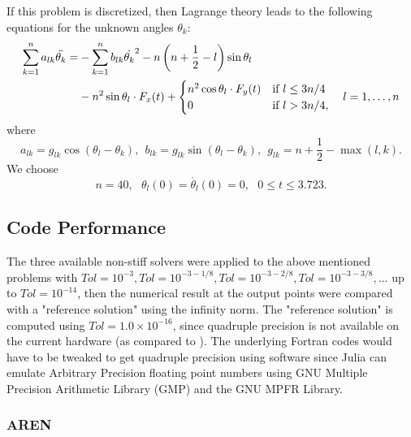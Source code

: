 \documentclass[notitlepage,12pt]{article}
\begin{document}
If this problem is discretized, then Lagrange theory leads to the following equations for the unknown angles $\theta_k$:
\begin{equation}
\begin{aligned}
\sum _{k=1}^n a_{lk} \ddot{\theta_k} = &-\sum _{k=1}^n b_{lk} \dot{\theta_k}^2 -n\left(n+\frac{1}{2} -l \right)\sin{\theta_l}\\
&-n^2\sin{\theta_l}\cdot F_x(t) + \begin{cases}
               n^2\cos{\theta_l}\cdot F_y(t) &\textnormal{if}\ l\leq 3n/4\\
               0 &\textnormal{if}\ l > 3n/4,
            \end{cases} \ \ \  l = 1,\ldots,n
\end{aligned}
\end{equation}
where
\begin{equation}
	a_{lk} = g_{lk}\cos{(\theta_l -\theta_k)}, \ \ b_{lk} = g_{lk}\sin{(\theta_l -\theta_k)},\ \ g_{lk} = n+\frac{1}{2} - \max{(l,k)}.
\end{equation}
We choose
\begin{equation}
	n=40, \ \ \ \theta_l(0) = \dot{\theta_l}(0) = 0, \ \ \ 0 \leq t \leq 3.723.
\end{equation}

\newpage

\subsection{Code Performance}
\label{sec:codePerfNonStiff}
The three available non-stiff solvers were applied to the above mentioned problems with $Tol = 10^{-3} , Tol =
10^{-3-1/8} , Tol = 10^{-3-2/8}, Tol = 10^{-3-3/8},\ldots$ up to $Tol = 10^{-14}$, then the numerical result at the output points were compared with a "reference solution" using the infinity norm. The "reference solution" is computed using $Tol=1.0\times 10^{-16}$, since quadruple precision is not available on the current hardware (as compared to \cite{nonStiff}). The underlying Fortran codes would have to be tweaked to get quadruple precision using software since Julia can emulate Arbitrary Precision floating point numbers using GNU Multiple Precision Arithmetic Library (GMP) and the GNU MPFR Library.

\subsubsection{AREN}
\label{sub:aren}
\end{document}
